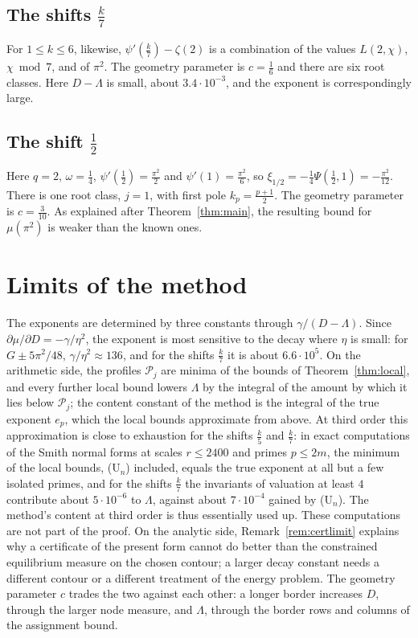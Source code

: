 \documentclass[11pt]{amsart}
\theoremstyle{definition}
\theoremstyle{remark}
\numberwithin{equation}{section}
\begin{document}
\subsection{The shifts $\frac k7$}\label{sec:sevenths}
For $1\le k\le6$, likewise, $\psi'(\frac k7)-\zeta(2)$ is a combination of the values $L(2,\chi)$, $\chi\bmod7$, and of $\pi^2$.
The geometry parameter is $c=\frac16$ and there are six root classes. Here $D-\Lambda$ is small, about $3.4\cdot10^{-3}$, and
the exponent is correspondingly large.

\subsection{The shift $\frac12$}\label{sec:halves}
Here $q=2$, $\omega=\frac14$, $\psi'(\frac12)=\frac{\pi^2}2$ and $\psi'(1)=\frac{\pi^2}6$, so
$\xi_{1/2}=-\frac14\Psi(\frac12,1)=-\frac{\pi^2}{12}$. There is one root class, $j=1$, with first pole $k_p=\frac{p+1}2$.
The geometry parameter is $c=\frac3{10}$. As explained after Theorem~\ref{thm:main}, the resulting bound for $\mu(\pi^2)$ is
weaker than the known ones.

\section{Limits of the method}\label{sec:limits}

The exponents are determined by three constants through $\gamma/(D-\Lambda)$. Since $\partial\mu/\partial D=-\gamma/\eta^2$, the
exponent is most sensitive to the decay where $\eta$ is small: for $G\pm5\pi^2/48$, $\gamma/\eta^2\approx136$, and for the
shifts $\frac k7$ it is about $6.6\cdot10^5$. On the arithmetic side, the profiles $\mathcal P_j$ are minima of the bounds of
Theorem~\ref{thm:local}, and every further local bound lowers $\Lambda$ by the integral of the amount by which it lies below
$\mathcal P_j$; the content constant of the method is the integral of the true exponent $e_p$, which the local bounds approximate
from above. At third order this approximation is close to exhaustion for the shifts $\frac k5$ and $\frac k7$: in exact
computations of the Smith normal forms at scales $r\le2400$ and primes $p\le2m$, the minimum of the local bounds, (U$_n$)
included, equals the true exponent at all but a few isolated primes, and for the shifts $\frac k7$ the invariants of valuation at least $4$ contribute about $5\cdot10^{-6}$ to
$\Lambda$, against about $7\cdot10^{-4}$ gained by (U$_n$). The method's content at third order is thus essentially used up.
These computations are not part of the proof. On the analytic side, Remark~\ref{rem:certlimit} explains why a certificate of the present form cannot do
better than the constrained equilibrium measure on the chosen contour; a larger decay constant needs a different contour or a
different treatment of the energy problem. The geometry parameter $c$ trades the two against each other: a longer border
increases $D$, through the larger node measure, and $\Lambda$, through the border rows and columns of the assignment
bound.
\end{document}
